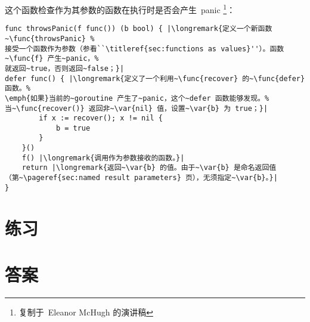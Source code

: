 这个函数检查作为其参数的函数在执行时是否会产生~panic
\footnote{复制于~Eleanor McHugh 的演讲稿}：
\begin{lstlisting}
func throwsPanic(f func()) (b bool) { |\longremark{定义一个新函数~\func{throwsPanic} %
接受一个函数作为参数（参看``\titleref{sec:functions as values}''）。函数~\func{f} 产生~panic，%
就返回~true，否则返回~false；}|
defer func() { |\longremark{定义了一个利用~\func{recover} 的~\func{defer} 函数。%
\emph{如果}当前的~goroutine 产生了~panic，这个~defer 函数能够发现。%
当~\func{recover()} 返回非~\var{nil} 值，设置~\var{b} 为 true；}|
        if x := recover(); x != nil {
            b = true
        }
    }()
    f() |\longremark{调用作为参数接收的函数。}|
    return |\longremark{返回~\var{b} 的值。由于~\var{b} 是命名返回值
（第~\pageref{sec:named result parameters} 页），无须指定~\var{b}。}|
}
\end{lstlisting}
\showremarks

\section{练习}




















\cleardoublepage
\section{答案}
\shipoutAnswer
